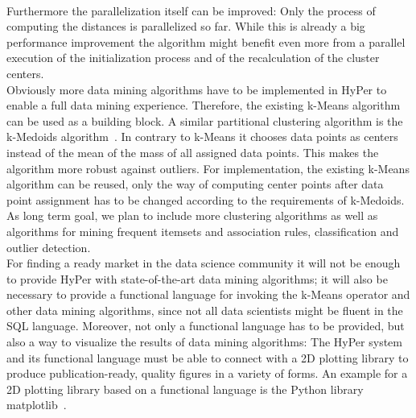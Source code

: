 \\
Furthermore the parallelization itself can be improved: Only the process of computing the distances is parallelized so far. While this is already a big performance improvement the algorithm might benefit even more from a parallel execution of the initialization process and of the recalculation of the cluster centers.
\\
Obviously more data mining algorithms have to be implemented in HyPer to enable a full data mining experience. Therefore, the existing k-Means algorithm can be used as a building block. A similar partitional clustering algorithm is the k-Medoids algorithm~\parencite{medoid}. In contrary to k-Means it chooses data points as centers instead of the mean of the mass of all assigned data points. This makes the algorithm more robust against outliers. For implementation, the existing k-Means algorithm can be reused, only the way of computing center points after data point assignment has to be changed according to the requirements of k-Medoids. As long term goal, we plan to include more clustering algorithms as well as algorithms for mining frequent itemsets and association rules, classification and outlier detection.
\\
For finding a ready market in the data science community it will not be enough to provide HyPer with state-of-the-art data mining algorithms; it will also be necessary to provide a functional language for invoking the k-Means operator and other data mining algorithms, since not all data scientists might be fluent in the SQL language. Moreover, not only a functional language has to be provided, but also a way to visualize the results of data mining algorithms: The HyPer system and its functional language must be able to connect with a 2D plotting library to produce publication-ready, quality figures in a variety of forms. An example for a 2D plotting library based on a functional language is the Python library matplotlib~\parencite{Hunter:2007}. 






